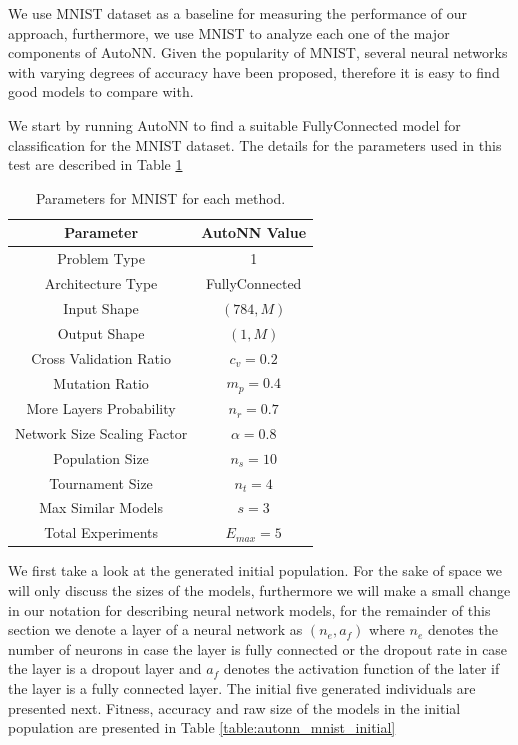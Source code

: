 \documentclass[journal]{IEEEtran}
\begin{document}
We use MNIST dataset as a baseline for measuring the performance of our approach, furthermore, we use MNIST to analyze each one of the major components of AutoNN. Given the popularity of MNIST, several neural networks with varying degrees of accuracy have been proposed, therefore it is easy to find good models to compare with. 

We start by running AutoNN to find a suitable FullyConnected model for classification for the MNIST dataset. The details for the parameters used in this test are described in Table \ref{table:MNIST_params}

\begin{table}[!htb]
\begin{center}
\begin{tabular}{| c | c |}
\hline
Parameter & AutoNN Value \\
\hline
Problem Type & 1 \\
Architecture Type & FullyConnected \\
Input Shape & $(784, M)$  \\
Output Shape & $(1, M)$ \\
Cross Validation Ratio & $c_v = 0.2$ \\
Mutation Ratio & $m_p = 0.4$ \\
More Layers Probability & $n_r = 0.7$ \\
Network Size Scaling Factor & $\alpha = 0.8$ \\
Population Size & $n_s = 10$ \\
Tournament Size & $n_t = 4$ \\
Max Similar Models & $s = 3$ \\
Total Experiments & $E_{max} = 5$ \\
\hline
\end{tabular}
\end{center}
\caption{Parameters for MNIST for each method.}
\label{table:MNIST_params}
\end{table}

We first take a look at the generated initial population. For the sake of space we will only discuss the sizes of the models, furthermore we will make a small change in our notation for describing neural network models, for the remainder of this section we denote a layer of a neural network as $(n_e, a_f)$ where $n_e$ denotes the number of neurons in case the layer is fully connected or the dropout rate in case the layer is a dropout layer and $a_f$ denotes the activation function of the later if the layer is a fully connected layer. The initial five generated individuals are presented next. Fitness, accuracy and raw size of the models in the initial population are presented in Table \ref{table:autonn_mnist_initial}
\end{document}
